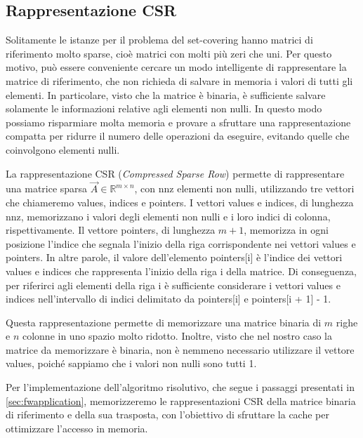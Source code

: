 \subsection{Rappresentazione CSR}
\label{sec:csr}

Solitamente le istanze per il problema del set-covering hanno matrici di riferimento molto sparse, cioè matrici con
molti più zeri che uni. Per questo motivo, può essere conveniente cercare un modo intelligente di rappresentare la
matrice di riferimento, che non richieda di salvare in memoria i valori di tutti gli elementi. In particolare, visto
che la matrice è binaria, è sufficiente salvare solamente le informazioni relative agli elementi non nulli. In questo
modo possiamo risparmiare molta memoria e provare a sfruttare una rappresentazione compatta per ridurre il numero delle
operazioni da eseguire, evitando quelle che coinvolgono elementi nulli.

La rappresentazione CSR (\textit{Compressed Sparse Row}) permette di rappresentare una matrice sparsa \( \vec{A} \in
\mathbb{R}^{m\times n}\), con {\jbm nnz} elementi non nulli, utilizzando tre vettori che chiameremo {\jbm values,
indices} e {\jbm pointers}. I vettori {\jbm values} e {\jbm indices}, di lunghezza {\jbm nnz}, memorizzano i valori
degli elementi non nulli e i loro indici di colonna, rispettivamente. Il vettore {\jbm pointers}, di lunghezza \( m + 1
\), memorizza in ogni posizione l'indice che segnala l'inizio della riga corrispondente nei vettori {\jbm values} e
{\jbm pointers}. In altre parole, il valore dell'elemento {\jbm pointers[i]} è l'indice dei vettori {\jbm values} e
{\jbm indices} che rappresenta l'inizio della riga {\jbm i} della matrice. Di conseguenza, per riferirci agli elementi
della riga {\jbm i} è sufficiente considerare i vettori {\jbm values} e {\jbm indices} nell'intervallo di indici
delimitato da {\jbm pointers[i]} e {\jbm pointers[i + 1] - 1}.

Questa rappresentazione permette di memorizzare una matrice binaria di \( m \) righe e \( n \) colonne in uno spazio
molto ridotto. Inoltre, visto che nel nostro caso la matrice da memorizzare è binaria, non è nemmeno necessario
utilizzare il vettore {\jbm values}, poiché sappiamo che i valori non nulli sono tutti 1.

Per l'implementazione dell'algoritmo risolutivo, che segue i passaggi presentati in \ref{sec:fwapplication},
memorizzeremo le rappresentazioni CSR della matrice binaria di riferimento e della sua trasposta, con l'obiettivo di
sfruttare la cache per ottimizzare l'accesso in memoria.
